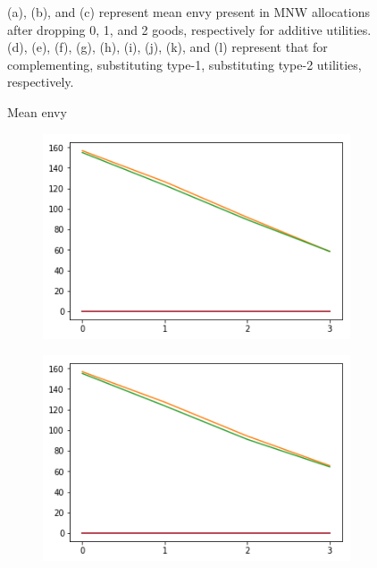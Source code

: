 \begin{figure}[h!]
\begin{subfigure}[b]{0.3\linewidth}
    \caption{}
  \end{subfigure}
  \caption{Mean envy}
  \label{fig_efk_mean}
  \small
    (a), (b), and (c) represent mean envy present in MNW allocations after dropping 0, 1, and 2 goods, respectively for additive utilities. (d), (e), (f), (g), (h), (i), (j), (k), and (l) represent that for complementing, substituting type-1, substituting type-2 utilities, respectively.
\end{figure}

\begin{figure}[h!]
  \centering
  \begin{subfigure}[b]{0.3\linewidth}
    \includegraphics[width=\linewidth]{images/add/ef0_means_pos.png}
    \caption{}
  \end{subfigure}
  \begin{subfigure}[b]{0.3\linewidth}
    \includegraphics[width=\linewidth]{images/add/ef1_means_pos.png}

\end{subfigure}
\end{figure}
